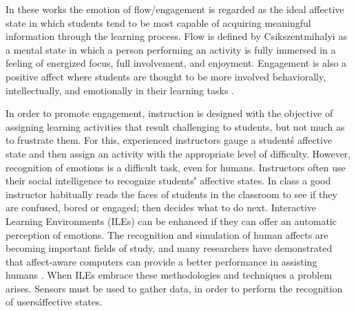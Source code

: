 \documentclass[a4paper,twoside]{article}
\begin{document}
In these works the emotion of flow/engagement is regarded as the ideal affective state in which
students tend to be most capable of acquiring meaningful information through the
learning process. Flow is defined by Csikszentmihalyi \cite{csikszentmihalyi1990flow}
as a mental state in which a person performing an activity is fully immersed in a feeling of
energized focus, full involvement, and enjoyment. Engagement is also a positive
affect where students are thought to be more involved behaviorally,
intellectually, and emotionally in their learning tasks \cite{bangert2002teacher}.

In order to promote engagement, instruction is designed with the
objective of assigning learning activities
that result challenging to students, but not much as to frustrate them. For
this, experienced instructors gauge a student\'s affective state and then assign
an activity with the appropriate level of difficulty. However, recognition of 
emotions is a difficult task, even
for humans. Instructors often use their social intelligence to recognize
students\'' affective states. In class a good instructor habitually reads the
faces of students in the classroom to see if they are confused, bored or
engaged; then decides what to do next. Interactive Learning Environments (ILEs)
can be enhanced if they can offer an
automatic perception of emotions. The recognition and simulation of human
affects are becoming important fields of study, and many researchers have
demonstrated that affect-aware computers can provide a better performance in assisting
humans \cite{picard2001toward}. When ILEs embrace these methodologies and techniques a
problem arises. Sensors must be used to gather data, in order to perform the 
recognition of users\' affective states.
\end{document}
